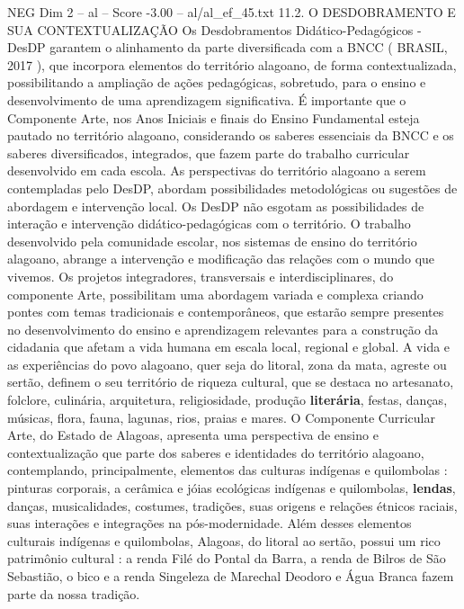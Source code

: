 \begin{textsample}{NEG Dim 2 – al – Score -3.00 – al/al\_ef\_45.txt}  \label{ex:f2_neg_025}
11.2.
O DESDOBRAMENTO E SUA CONTEXTUALIZAÇÃO Os Desdobramentos Didático-Pedagógicos - DesDP garantem o alinhamento da parte diversificada com a BNCC ( BRASIL, 2017 ), que incorpora elementos do território alagoano, de forma contextualizada, possibilitando a ampliação de ações pedagógicas, sobretudo, para o ensino e desenvolvimento de uma aprendizagem significativa.
É importante que o Componente Arte, nos Anos Iniciais e finais do Ensino Fundamental esteja pautado no território alagoano, considerando os saberes essenciais da BNCC e os saberes diversificados, integrados, que fazem parte do trabalho curricular desenvolvido em cada escola.
As perspectivas do território alagoano a serem contempladas pelo DesDP, abordam possibilidades metodológicas ou sugestões de abordagem e intervenção local.
Os DesDP não esgotam as possibilidades de interação e intervenção didático-pedagógicas com o território.
O trabalho desenvolvido pela comunidade escolar, nos sistemas de ensino do território alagoano, abrange a intervenção e modificação das relações com o mundo que vivemos.
Os projetos integradores, transversais e interdisciplinares, do componente Arte, possibilitam uma abordagem variada e complexa criando pontes com temas tradicionais e contemporâneos, que estarão sempre presentes no desenvolvimento do ensino e aprendizagem relevantes para a construção da cidadania que afetam a vida humana em escala local, regional e global.
A vida e as experiências do povo alagoano, quer seja do litoral, zona da mata, agreste ou sertão, definem o seu território de riqueza cultural, que se destaca no artesanato, folclore, culinária, arquitetura, religiosidade, produção \textbf{literária}, festas, danças, músicas, flora, fauna, lagunas, rios, praias e mares.
O Componente Curricular Arte, do Estado de Alagoas, apresenta uma perspectiva de ensino e contextualização que parte dos saberes e identidades do território alagoano, contemplando, principalmente, elementos das culturas indígenas e quilombolas : pinturas corporais, a cerâmica e jóias ecológicas indígenas e quilombolas, \textbf{lendas}, danças, musicalidades, costumes, tradições, suas origens e relações étnicos raciais, suas interações e integrações na pós-modernidade.
Além desses elementos culturais indígenas e quilombolas, Alagoas, do litoral ao sertão, possui um rico patrimônio cultural : a renda Filé do Pontal da Barra, a renda de Bilros de São Sebastião, o bico e a renda Singeleza de Marechal Deodoro e Água Branca fazem parte da nossa tradição.

\end{textsample}
